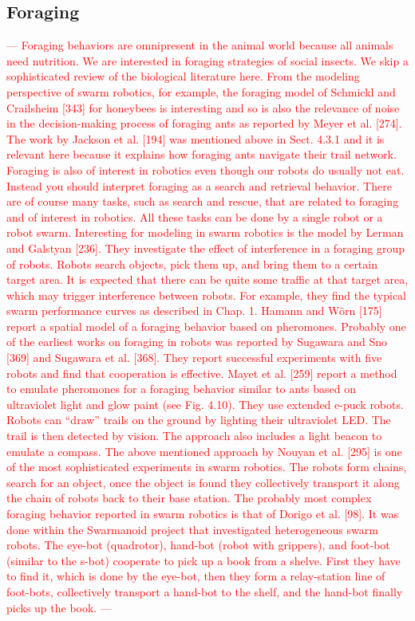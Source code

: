 \subsection{Foraging} \label{subsection:foraging}
\textcolor{red}{---
Foraging behaviors are omnipresent in the animal world because all animals need nutrition. 
We are interested in foraging strategies of social insects.
We skip a sophisticated review of the biological literature here. 
From the modeling perspective of swarm robotics, for example, 
the foraging model of Schmickl and Crailsheim [343] for honeybees is interesting and so is also the relevance of noise in the decision-making process of foraging ants as reported by Meyer et al. [274]. 
The work by Jackson et al. [194] was mentioned above in Sect. 4.3.1 and it is relevant here because it explains how foraging ants navigate their trail network.
Foraging is also of interest in robotics even though our robots do usually not eat. 
Instead you should interpret foraging as a search and retrieval behavior. 
There are of course many tasks, such as search and rescue, that are related to foraging and of interest in robotics. 
All these tasks can be done by a single robot or a robot swarm.
Interesting for modeling in swarm robotics is the model by Lerman and Galstyan [236]. 
They investigate the effect of interference in a foraging group of robots. 
Robots search objects, pick them up, and bring them to a certain target area. 
It is expected that there can be quite some traffic at that target area, which may trigger interference between robots. 
For example, they find the typical swarm performance curves as described in Chap. 1. Hamann and Wörn [175] report a spatial model of a foraging behavior based on pheromones.
Probably one of the earliest works on foraging in robots was reported by Sugawara and Sno [369] and Sugawara et al. [368]. 
They report successful experiments with five robots and find that cooperation is effective.
Mayet et al. [259] report a method to emulate pheromones for a foraging behavior similar to ants based on ultraviolet light and glow paint (see Fig. 4.10). 
They use extended e-puck robots. Robots can “draw” trails on the ground by lighting their ultraviolet LED. 
The trail is then detected by vision. 
The approach also includes a light beacon to emulate a compass.
The above mentioned approach by Nouyan et al. [295] is one of the most sophisticated experiments in swarm robotics. 
The robots form chains, search for an object, once the object is found they collectively transport it along the chain of robots back to their base station.
The probably most complex foraging behavior reported in swarm robotics is that of Dorigo et al. [98]. 
It was done within the Swarmanoid project that investigated heterogeneous swarm robots. 
The eye-bot (quadrotor), hand-bot (robot with grippers), and foot-bot (similar to the s-bot) cooperate to pick up a book from a shelve. 
First they have to find it, which is done by the eye-bot, 
then they form a relay-station line of foot-bots, 
collectively transport a hand-bot to the shelf, 
and the hand-bot finally picks up the book.
---}



